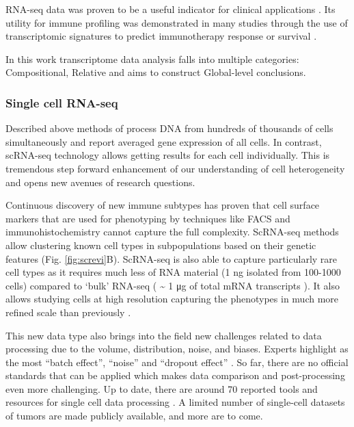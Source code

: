 \documentclass[12pt,]{book}
\theoremstyle{definition}
\theoremstyle{definition}
\theoremstyle{definition}
\theoremstyle{remark}
\begin{document}
RNA-seq data was proven to be a useful indicator for clinical
applications \citep{Mody2015, Oberg2016, Robinson2017}. Its utility for
immune profiling was demonstrated in many studies through the use of
transcriptomic signatures to predict immunotherapy response or survival
\citep{Chen2016}.

In this work transcriptome data analysis falls into multiple categories:
Compositional, Relative and aims to construct Global-level conclusions.

\hypertarget{single-cell-rna-seq}{%
\subsubsection{Single cell RNA-seq}\label{single-cell-rna-seq}}

Described above methods of process DNA from hundreds of thousands of
cells simultaneously and report averaged gene expression of all cells.
In contrast, scRNA-seq technology allows getting results for each cell
individually. This is tremendous step forward enhancement of our
understanding of cell heterogeneity and opens new avenues of research
questions.

Continuous discovery of new immune subtypes has proven that cell surface
markers that are used for phenotyping by techniques like FACS and
immunohistochemistry cannot capture the full complexity. ScRNA-seq
methods allow clustering known cell types in subpopulations based on
their genetic features (Fig. \ref{fig:screvi}B). ScRNA-seq is also able
to capture particularly rare cell types as it requires much less of RNA
material (1 ng isolated from 100-1000 cells) compared to `bulk' RNA-seq
( \textasciitilde{} 1 μg of total mRNA transcripts ). It also allows
studying cells at high resolution capturing the phenotypes in much more
refined scale than previously \citep{Papalexi2017}.

This new data type also brings into the field new challenges related to
data processing due to the volume, distribution, noise, and biases.
Experts highlight as the most ``batch effect'', ``noise'' and ``dropout
effect'' \citep{Perkel2017}. So far, there are no official standards
that can be applied which makes data comparison and post-processing even
more challenging. Up to date, there are around 70 reported tools and
resources for single cell data processing \citep{Davis2016}. A limited
number of single-cell datasets of tumors are made publicly available,
and more are to come.
\end{document}
